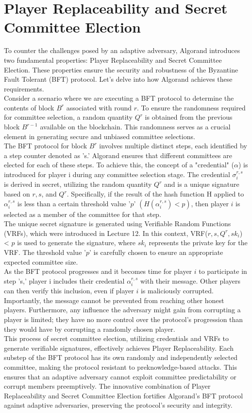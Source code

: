 \section{Player Replaceability and Secret Committee Election}
To counter the challenges posed by an adaptive adversary, Algorand introduces two fundamental properties: Player Replaceability and Secret Committee Election. These properties ensure the security and robustness of the Byzantine Fault Tolerant (BFT) protocol. Let's delve into how Algorand achieves these requirements.\\
Consider a scenario where we are executing a BFT protocol to determine the contents of block $B^{r}$ associated with round $r$. To ensure the randomness required for committee selection, a random quantity $Q^{r}$ is obtained from the previous block $B^{r-1}$ available on the blockchain. This randomness serves as a crucial element in generating secure and unbiased committee selections.\\
The BFT protocol for block $B^{r}$ involves multiple distinct steps, each identified by a step counter denoted as 's.' Algorand ensures that different committees are elected for each of these steps. To achieve this, the concept of a "credential" ($\alpha$) is introduced for player i during any committee selection stage. The credential $σ_{i}^{r, s}$ is derived in secret, utilizing the random quantity $Q^{r}$ and is a unique signature based on $r, s$, and $Q^{r}$. Specifically, if the result of the hash function H applied to $\alpha_{i}^{r, s}$ is less than a certain threshold value '$p$' $(H(\alpha_{i}^{r, s}) < p)$, then player $i$ is selected as a member of the committee for that step.\\
The unique secret signature is generated using Verifiable Random Functions (VRFs), which were introduced in Lecture 12. In this context, VRF($r, s, Q^{r}, sk_{i}$) < $p$ is used to generate the signature, where $sk_{i}$ represents the private key for the VRF. The threshold value '$p$' is carefully chosen to ensure an appropriate expected committee size.\\
As the BFT protocol progresses and it becomes time for player $i$ to participate in step 's,' player i includes their credential $\alpha_{i}^{r, s}$ with their message. Other players can then verify this inclusion, even if player $i$ is maliciously corrupted. Importantly, the message cannot be prevented from reaching other honest players. Furthermore, any influence the adversary might gain from corrupting a player is limited; they have no more control over the protocol's progression than they would have by corrupting a randomly chosen player.\\
This process of secret committee election, utilizing credentials and VRFs to generate verifiable signatures, effectively achieves Player Replaceability. Each substep of the BFT protocol has its own randomly and independently selected committee, making the protocol resistant to preknowledge-based attacks. This ensures that an adaptive adversary cannot exploit committee predictability or corrupt members preemptively. The innovative combination of Player Replaceability and Secret Committee Election fortifies Algorand's BFT protocol against adaptive adversaries, preserving the protocol's security and integrity.
